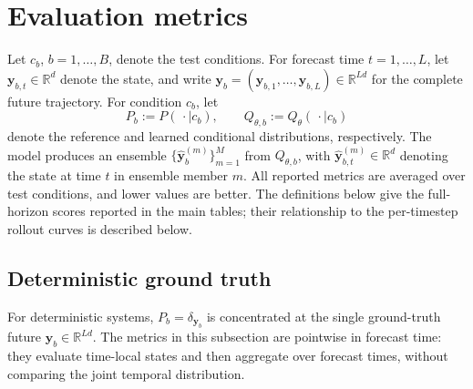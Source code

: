 \medskip
\noindent
\clearpage
\section{Evaluation metrics}
\label{sec:metrics}

Let $c_b$, $b=1,\ldots,B$, denote the test conditions. For forecast time
$t=1,\ldots,L$, let $\mathbf y_{b,t}\in\mathbb{R}^{d}$ denote the state, and
write $\mathbf y_b=(\mathbf y_{b,1},\ldots,\mathbf y_{b,L})\in
\mathbb{R}^{Ld}$ for the complete future trajectory. For condition $c_b$, let
\[
P_b := P(\,\cdot\mid c_b),
\qquad
Q_{\theta,b} := Q_\theta(\,\cdot\mid c_b)
\]
denote the reference and learned conditional distributions, respectively.
The model produces an ensemble
$\{\widehat{\mathbf y}_b^{(m)}\}_{m=1}^{M}$ from $Q_{\theta,b}$, with
$\widehat{\mathbf y}_{b,t}^{(m)}\in\mathbb R^d$ denoting the state at time
$t$ in ensemble member $m$.
All reported metrics are averaged over test conditions, and lower values are
better. The definitions below give the full-horizon scores reported in the
main tables; their relationship to the per-timestep rollout curves is described below.

\subsection{Deterministic ground truth}

For deterministic systems, $P_b=\delta_{\mathbf y_b}$ is concentrated at the
single ground-truth future $\mathbf y_b\in\mathbb{R}^{Ld}$. The metrics in
this subsection are pointwise in forecast time: they evaluate time-local
states and then aggregate over forecast times, without comparing the joint
temporal distribution.

